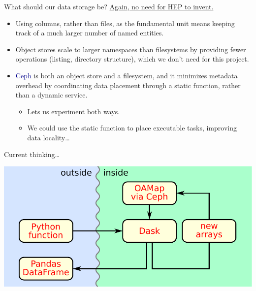 \documentclass[aspectratio=169]{beamer}
\begin{document}
\begin{frame}{What should our data storage be?}
\vspace{0.5 cm}
\underline{Again, no need for HEP to invent.}

\vspace{0.25 cm}
\begin{itemize}\setlength{\itemsep}{0.25 cm}
\item<2-> Using columns, rather than files, as the fundamental unit means keeping track of a much larger number of named entities.

\item<3-> Object stores scale to larger namespaces than filesystems by providing fewer operations (listing, directory structure), which we don't need for this project.

\item<4-> \textcolor{darkblue}{Ceph} is both an object store and a filesystem, and it minimizes metadata overhead by coordinating data placement through a static function, rather than a dynamic service.

\begin{itemize}
\item<5-> Lets us experiment both ways.

\item<5-> We could use the static function to place executable tasks, improving data locality\ldots
\end{itemize}
\end{itemize}
\end{frame}

\begin{frame}{Current thinking\ldots}
\vspace{0.5 cm}
\begin{center}
\includegraphics[width=0.7\linewidth]{block-diagram-ceph.pdf}
\end{center}
\end{frame}
\end{document}
